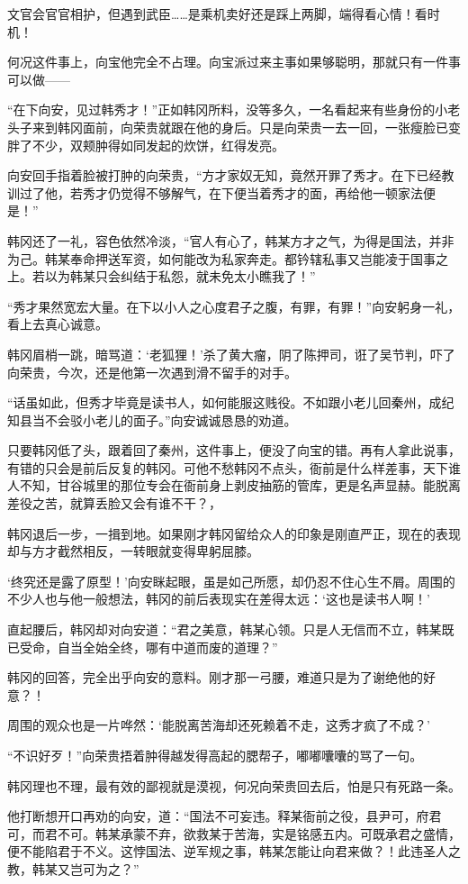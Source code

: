 文官会官官相护，但遇到武臣……是乘机卖好还是踩上两脚，端得看心情！看时机！

何况这件事上，向宝他完全不占理。向宝派过来主事如果够聪明，那就只有一件事可以做——

“在下向安，见过韩秀才！”正如韩冈所料，没等多久，一名看起来有些身份的小老头子来到韩冈面前，向荣贵就跟在他的身后。只是向荣贵一去一回，一张瘦脸已变胖了不少，双颊肿得如同发起的炊饼，红得发亮。

向安回手指着脸被打肿的向荣贵，“方才家奴无知，竟然开罪了秀才。在下已经教训过了他，若秀才仍觉得不够解气，在下便当着秀才的面，再给他一顿家法便是！”

韩冈还了一礼，容色依然冷淡，“官人有心了，韩某方才之气，为得是国法，并非为己。韩某奉命押送军资，如何能改为私家奔走。都钤辖私事又岂能凌于国事之上。若以为韩某只会纠结于私怨，就未免太小瞧我了！”

“秀才果然宽宏大量。在下以小人之心度君子之腹，有罪，有罪！”向安躬身一礼，看上去真心诚意。

韩冈眉梢一跳，暗骂道：‘老狐狸！’杀了黄大瘤，阴了陈押司，诳了吴节判，吓了向荣贵，今次，还是他第一次遇到滑不留手的对手。

“话虽如此，但秀才毕竟是读书人，如何能服这贱役。不如跟小老儿回秦州，成纪知县当不会驳小老儿的面子。”向安诚诚恳恳的劝道。

只要韩冈低了头，跟着回了秦州，这件事上，便没了向宝的错。再有人拿此说事，有错的只会是前后反复的韩冈。可他不愁韩冈不点头，衙前是什么样差事，天下谁人不知，甘谷城里的那位专会在衙前身上剥皮抽筋的管库，更是名声显赫。能脱离差役之苦，就算丢脸又会有谁不干？，

韩冈退后一步，一揖到地。如果刚才韩冈留给众人的印象是刚直严正，现在的表现却与方才截然相反，一转眼就变得卑躬屈膝。

‘终究还是露了原型！’向安眯起眼，虽是如己所愿，却仍忍不住心生不屑。周围的不少人也与他一般想法，韩冈的前后表现实在差得太远：‘这也是读书人啊！’

直起腰后，韩冈却对向安道：“君之美意，韩某心领。只是人无信而不立，韩某既已受命，自当全始全终，哪有中道而废的道理？”

韩冈的回答，完全出乎向安的意料。刚才那一弓腰，难道只是为了谢绝他的好意？！

周围的观众也是一片哗然：‘能脱离苦海却还死赖着不走，这秀才疯了不成？’

“不识好歹！”向荣贵捂着肿得越发得高起的腮帮子，嘟嘟囔囔的骂了一句。

韩冈理也不理，最有效的鄙视就是漠视，何况向荣贵回去后，怕是只有死路一条。

他打断想开口再劝的向安，道：“国法不可妄违。释某衙前之役，县尹可，府君可，而君不可。韩某承蒙不弃，欲救某于苦海，实是铭感五内。可既承君之盛情，便不能陷君于不义。这悖国法、逆军规之事，韩某怎能让向君来做？！此违圣人之教，韩某又岂可为之？”

